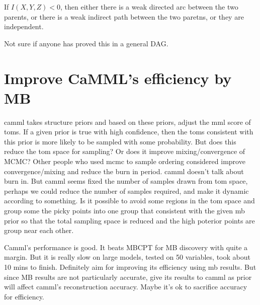 \begin{proposition}
If $I(X, Y, Z) < 0$, then either there is a weak directed arc between the two parents, or there is a weak indirect path between the two paretns, or they are independent. 
\end{proposition}
Not sure if anyone has proved this in a general DAG. 


\section{Improve CaMML's efficiency by MB}
camml takes structure priors and based on these priors, adjust the mml score of toms. If a given prior is true with high confidence, then the toms consistent with this prior is more likely to be sampled with some probability. But does this reduce the tom space for sampling? Or does it improve mixing/convergence of MCMC? Other people who used mcmc to sample ordering considered improve convergence/mixing and reduce the burn in period. camml doesn't talk about burn in. But camml seems fixed the number of samples drawn from tom space, perhaps we could reduce the number of samples required, and make it dynamic according to something. Is it possible to avoid some regions in the tom space and group some the picky points into one group that consistent with the given mb prior so that the total sampling space is reduced and the high poterior points are group near each other. 

Camml's performance is good. It beats MBCPT for MB discovery with quite a margin. But it is really slow on large models, tested on 50 variables, took about 10 mins to finish. Definitely aim for improving its efficiency using mb results. But since MB results are not particularly accurate, give its results to camml as prior will affect camml's reconstruction accuracy. Maybe it's ok to sacrifice accuracy for efficiency. 

